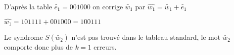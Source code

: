 \documentclass[a4paper,11pt]{article}
\begin{document}
\vspace{2ex}
D'après la table $\tilde{e_1}=001000$ on corrige $\tilde{w_1}$ par $\hat{w_1}=\tilde{w_1}+\tilde{e_1}$

$\hat{w_1}=101111+001000=100111$

\vspace{2ex}
Le syndrome $S(\tilde{w_2})$ n'est pas trouvé dans le tableau standard, le mot $\tilde{w_2}$ comporte donc plus de $k=1$ erreurs.
\end{document}
